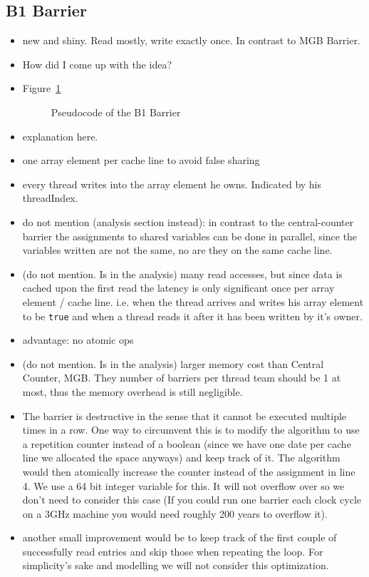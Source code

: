 \documentclass[a4paper, 10pt]{article}
\begin{document}
\subsection{B1 Barrier}
\label{ssec:new-b1}
\begin{itemize}
	\item new and shiny. Read mostly, write exactly once. In contrast to MGB Barrier.
	\item How did I come up with the idea?
	\item Figure~\ref{fig:pseudocode-b1}
		\begin{figure}[htbp]
			\centering
			
			\caption{Pseudocode of the B1 Barrier}
			\label{fig:pseudocode-b1}
		\end{figure}
	\item explanation here.
	\item one array element per cache line to avoid false sharing\cite{falsesharing}
	\item every thread writes into the array element he owns. Indicated by his threadIndex.
	\item do not mention (analysis section instead): in contrast to the central-counter barrier the assignments to shared variables can be done in parallel, since the variables written are not the same, no are they on the same cache line.
	\item (do not mention. Is in the analysis) many read accesses, but since data is cached upon the first read the latency is only significant once per array element / cache line. i.e. when the thread arrives and writes his array element to be \texttt{true} and when a thread reads it after it has been written by it's owner.
	\item advantage: no atomic ops
	\item (do not mention. Is in the analysis) larger memory cost than Central Counter, MGB. They number of barriers per thread team should be 1 at most, thus the memory overhead is still negligible.
	\item The barrier is destructive in the sense that it cannot be executed multiple times in a row. One way to circumvent this is to modify the algorithm to use a repetition counter instead of a boolean (since we have one date per cache line we allocated the space anyways) and keep track of it. The algorithm would then atomically increase the counter instead of the assignment in line 4. We use a 64 bit integer variable for this. It will not overflow over so we don't need to consider this case (If you could run one barrier each clock cycle on a 3GHz machine you would need roughly 200 years to overflow it).
	\item another small improvement would be to keep track of the first couple of successfully read entries and skip those when repeating the loop. For simplicity's sake and modelling we will not consider this optimization.
\end{itemize}
\end{document}
